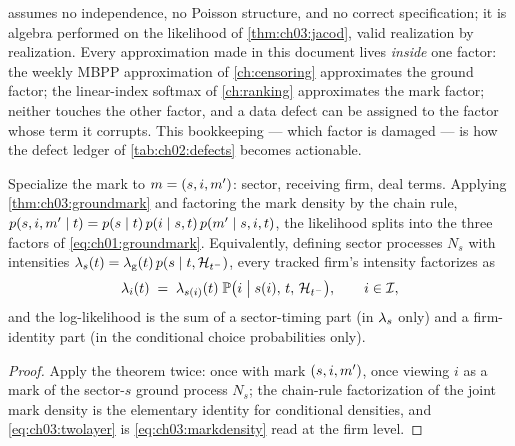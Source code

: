 \begin{remark}\label{rem:ch03:identity}
 assumes no independence, no Poisson structure,
and no correct specification; it is algebra performed on the likelihood of
\cref{thm:ch03:jacod}, valid realization by realization. Every
approximation made in this document lives \emph{inside} one factor: the
weekly MBPP approximation of \cref{ch:censoring} approximates the ground
factor; the linear-index softmax of \cref{ch:ranking} approximates the
mark factor; neither touches the other factor, and a data defect can be
assigned to the factor whose term it corrupts. This bookkeeping --- which
factor is damaged --- is how the defect ledger of \cref{tab:ch02:defects}
becomes actionable.
\end{remark}

\begin{corollary}\label{cor:ch03:twolayer}
Specialize the mark to $m = (s, i, m')$: sector, receiving firm,
deal terms. Applying \cref{thm:ch03:groundmark} and factoring the mark
density by the chain rule,
$p(s,i,m' \mid t) = p(s \mid t)\, p(i \mid s, t)\, p(m' \mid s,i,t)$,
the likelihood splits into the three factors of \cref{eq:ch01:groundmark}.
Equivalently, defining sector processes $N_s$ with intensities
$\lambda_s(t) = \lambda_{\mathrm g}(t)\,p(s\mid t,\mathcal{H}_{t^-})$, every tracked
firm's intensity factorizes as
\begin{equation}\label{eq:ch03:twolayer}
\lambda_i(t)
 \;=\;
 \lambda_{s(i)}(t)\;
 \mathbb{P}\big(i \;\big|\; s(i),\, t,\, \mathcal{H}_{t^-}\big),
 \qquad i \in \mathcal{I},
\end{equation}
and the log-likelihood is the sum of a sector-timing part (in
$\lambda_s$ only) and a firm-identity part (in the conditional choice
probabilities only).
\end{corollary}

\begin{proof}
Apply the theorem twice: once with mark $(s,i,m')$, once viewing $i$
as a mark of the sector-$s$ ground process $N_s$; the chain-rule
factorization of the joint mark density is the elementary identity for
conditional densities, and \cref{eq:ch03:twolayer} is
\cref{eq:ch03:markdensity} read at the firm level.
\end{proof}

